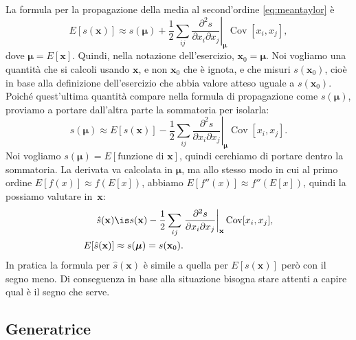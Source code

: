\begin{solution}
    La formula per la propagazione della media al second'ordine
    \eqref{eq:meantaylor} è
    \begin{equation*}
        E[s(\mathbf x)] \approx s(\boldsymbol\mu) +
        \frac12 \sum_{ij}
        \left.\frac{\partial^2 s}{\partial x_i \partial x_j}
        \right|_{\boldsymbol\mu}
        \operatorname{Cov}[x_i, x_j],
    \end{equation*}
    dove $\boldsymbol\mu = E[\mathbf x]$. Quindi, nella notazione
    dell'esercizio, $\mathbf x_0 = \boldsymbol\mu$. Noi vogliamo una quantità
    che si calcoli usando $\mathbf x$, e non $\mathbf x_0$ che è ignota,
    e che misuri $s(\mathbf x_0)$, cioè in base alla definizione dell'esercizio
    che abbia valore atteso uguale a $s(\mathbf x_0)$. Poiché quest'ultima
    quantità compare nella formula di propagazione come $s(\boldsymbol\mu)$,
    proviamo a portare dall'altra parte la sommatoria per isolarla:
    \begin{equation*}
        s(\boldsymbol\mu) \approx E[s(\mathbf x)] -
        \frac12 \sum_{ij}
        \left.\frac{\partial^2 s}{\partial x_i \partial x_j}
        \right|_{\boldsymbol\mu}
        \operatorname{Cov}[x_i, x_j].
    \end{equation*}
    Noi vogliamo $s(\boldsymbol\mu) = E[\text{funzione di $\mathbf x$}]$,
    quindi cerchiamo di portare dentro la sommatoria. La derivata va calcolata
    in $\boldsymbol\mu$, ma allo stesso modo in cui al primo ordine $E[f(x)]
    \approx f(E[x])$, abbiamo $E[f''(x)] \approx f''(E[x])$, quindi la
    possiamo valutare in~$\mathbf x$:
    \begin{align*}
        \hat s(\mathbf x) &\is s(\mathbf x) -
        \frac12 \sum_{ij}
        \left.\frac{\partial^2 s}{\partial x_i \partial x_j}
        \right|_{\mathbf x}
        \operatorname{Cov}[x_i, x_j], \\
        E[\hat s(\mathbf x)] &\approx s(\boldsymbol\mu) = s(\mathbf x_0).
    \end{align*}
    In pratica la formula per $\hat s(\mathbf x)$ è simile a quella per
    $E[s(\mathbf x)]$ però con il segno meno. Di conseguenza in base alla
    situazione bisogna stare attenti a capire qual è il segno che serve.
\end{solution}

\subsection{Generatrice}

